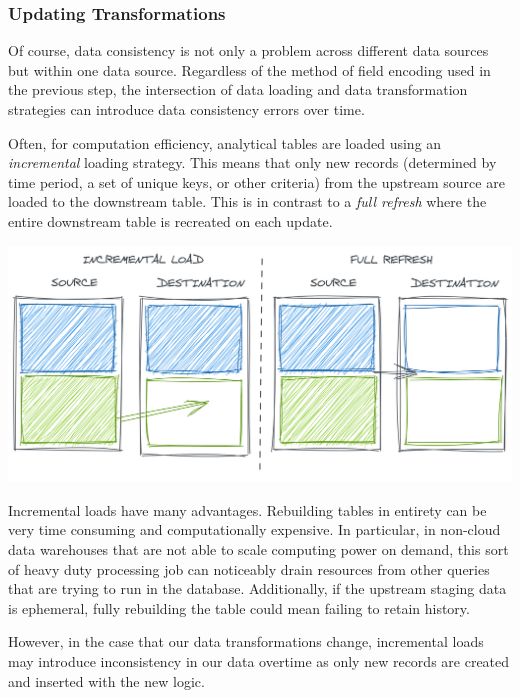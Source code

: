 \documentclass[
]{krantz}
\begin{document}
\hypertarget{updating-transformations-1}{%
\subsubsection{Updating Transformations}\label{updating-transformations-1}}

Of course, data consistency is not only a problem across different data sources but within one data source. Regardless of the method of field encoding used in the previous step, the intersection of data loading and data transformation strategies can introduce data consistency errors over time.

Often, for computation efficiency, analytical tables are loaded using an \emph{incremental} loading strategy. This means that only new records (determined by time period, a set of unique keys, or other criteria) from the upstream source are loaded to the downstream table. This is in contrast to a \emph{full refresh} where the entire downstream table is recreated on each update.

\begin{center}\includegraphics[width=0.9\linewidth]{figures/data-dall/incr-full-good} \end{center}

Incremental loads have many advantages. Rebuilding tables in entirety can be very time consuming and computationally expensive. In particular, in non-cloud data warehouses that are not able to scale computing power on demand, this sort of heavy duty processing job can noticeably drain resources from other queries that are trying to run in the database. Additionally, if the upstream staging data is ephemeral, fully rebuilding the table could mean failing to retain history.

However, in the case that our data transformations change, incremental loads may introduce inconsistency in our data overtime as only new records are created and inserted with the new logic.
\end{document}
